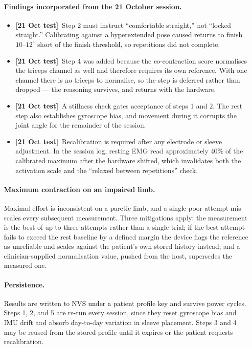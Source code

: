 \documentclass[11pt]{article}
\newcommand{\tested}{{\sffamily\scriptsize\color{good}\textbf{[21 Oct test]}}\ }
\begin{document}
\paragraph{Findings incorporated from the 21 October session.}
\begin{itemize}
\item \tested Step 2 must instruct ``comfortable straight,'' not ``locked
straight.'' Calibrating against a hyperextended pose caused returns to finish
$10$--$12^{\circ}$ short of the finish threshold, so repetitions did not
complete.
\item \tested Step 4 was added because the co-contraction score normalises the
triceps channel as well and therefore requires its own reference. With one
channel there is no triceps to normalise, so the step is deferred rather than
dropped --- the reasoning survives, and returns with the hardware.
\item \tested A stillness check gates acceptance of steps 1 and 2. The rest step
also establishes gyroscope bias, and movement during it corrupts the joint angle
for the remainder of the session.
\item \tested Recalibration is required after any electrode or sleeve
adjustment. In the session log, resting EMG read approximately 40\% of the
calibrated maximum after the hardware shifted, which invalidates both the
activation scale and the ``relaxed between repetitions'' check.
\end{itemize}

\paragraph{Maximum contraction on an impaired limb.} Maximal effort is
inconsistent on a paretic limb, and a single poor attempt mis-scales every
subsequent measurement. Three mitigations apply: the measurement is the best of
up to three attempts rather than a single trial; if the best attempt fails to
exceed the rest baseline by a defined margin the device flags the reference as
unreliable and scales against the patient's own stored history instead; and a
clinician-supplied normalisation value, pushed from the host, supersedes the
measured one.

\paragraph{Persistence.} Results are written to NVS under a patient profile key
and survive power cycles. Steps 1, 2, and 5 are re-run every session, since they
reset gyroscope bias and IMU drift and absorb day-to-day variation in sleeve
placement. Steps 3 and 4 may be reused from the stored profile until it expires
or the patient requests recalibration.
\end{document}
